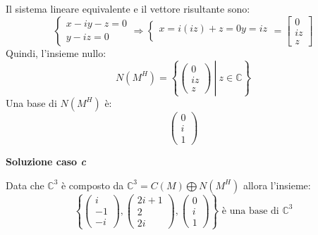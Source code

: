 \documentclass[a4paper]{article}
\begin{document}
	Il sistema lineare equivalente e il vettore risultante sono:
	\begin{equation*}
		\begin{cases}
			x - iy - z = 0 \\
			y - iz = 0
		\end{cases} \Longrightarrow
		\begin{cases}
			x = i\left(iz\right) + z = 0
			y = iz \\
		\end{cases} = \begin{bmatrix}
			0 \\
			iz \\
			z
		\end{bmatrix}
	\end{equation*}
	Quindi, l'insieme nullo:
	\begin{equation*}
		N\left(M^{H}\right) = \left\{\left.\begin{pmatrix}
			0 \\
			iz \\
			z
		\end{pmatrix} \: \right| \: z \in \mathbb{C}\right\}
	\end{equation*}
	Una base di $N\left(M^{H}\right)$ è:
	\begin{equation*}
		\begin{pmatrix}
			0 \\
			i \\
			1
		\end{pmatrix}
	\end{equation*}
	
	\noindent
	\textcolor{Green4}{\textbf{Soluzione caso \emph{c}}}\newline
	
	\noindent
	Data che $\mathbb{C}^{3}$ è composto da $\mathbb{C}^{3} = C\left(M\right) \bigoplus N\left(M^{H}\right)$ allora l'insieme:
	\begin{equation*}
		\left\{
		\begin{pmatrix}
			i \\
			-1 \\
			-i
		\end{pmatrix}, \begin{pmatrix}
			2i+1 \\
			2 \\
			2i
		\end{pmatrix}, \begin{pmatrix}
			0 \\
			i \\
			1
		\end{pmatrix}
		\right\} \text{ è una base di } \mathbb{C}^{3}
	\end{equation*}\newpage
\end{document}
